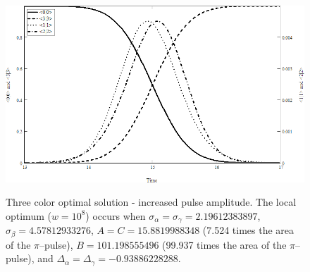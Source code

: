 \begin{figure}
\centering
\includegraphics[width=5.00in]
{big_solution_3_energy_levels/big_solution_3_energy_levels.png}\\
\caption[Three color optimal solution - increased pulse amplitude]{Three color optimal solution - increased pulse amplitude. The local optimum ($w=10^8$) occurs when $\sigma_\alpha=\sigma_\gamma=2.19612383897$, $\sigma_\beta=4.57812933276$, $A=C=15.8819988348$ (7.524 times the area of the $\pi$--pulse), $B=101.198555496$ (99.937 times the area of the $\pi$--pulse), and $\Delta_\alpha=\Delta_\gamma=-0.93886228288$.}
\label{big solution three energy levels}
\end{figure} 
